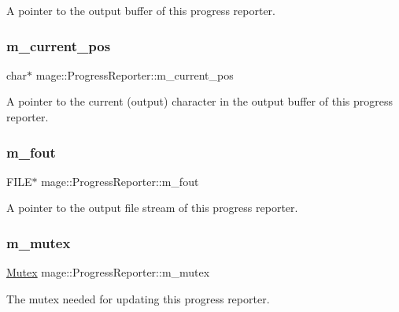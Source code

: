A pointer to the output buffer of this progress reporter. \hypertarget{classmage_1_1_progress_reporter_a7adafaaf90edf29c8c27f4008aea41c9}{}\label{classmage_1_1_progress_reporter_a7adafaaf90edf29c8c27f4008aea41c9} 
\subsubsection{\texorpdfstring{m\+\_\+current\+\_\+pos}{m\_current\_pos}}
{\footnotesize\ttfamily char$\ast$ mage\+::\+Progress\+Reporter\+::m\+\_\+current\+\_\+pos\hspace{0.3cm}{\ttfamily [private]}}

A pointer to the current (output) character in the output buffer of this progress reporter. \hypertarget{classmage_1_1_progress_reporter_ad325ee5978fd1d16a97acbe37a977982}{}\label{classmage_1_1_progress_reporter_ad325ee5978fd1d16a97acbe37a977982} 
\subsubsection{\texorpdfstring{m\+\_\+fout}{m\_fout}}
{\footnotesize\ttfamily F\+I\+LE$\ast$ mage\+::\+Progress\+Reporter\+::m\+\_\+fout\hspace{0.3cm}{\ttfamily [private]}}

A pointer to the output file stream of this progress reporter. \hypertarget{classmage_1_1_progress_reporter_a32a499aa1b8fccbc8393fe32305dfeb1}{}\label{classmage_1_1_progress_reporter_a32a499aa1b8fccbc8393fe32305dfeb1} 
\subsubsection{\texorpdfstring{m\+\_\+mutex}{m\_mutex}}
{\footnotesize\ttfamily \hyperlink{structmage_1_1_mutex}{Mutex} mage\+::\+Progress\+Reporter\+::m\+\_\+mutex\hspace{0.3cm}{\ttfamily [private]}}

The mutex needed for updating this progress reporter. \hypertarget{classmage_1_1_progress_reporter_a17d7a4f8b2c8a6de255786f6165726bd}{}\label{classmage_1_1_progress_reporter_a17d7a4f8b2c8a6de255786f6165726bd} 
